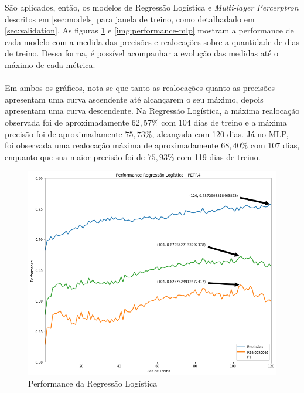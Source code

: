 \documentclass[grad,numbers]{coppe}
\begin{document}
        São aplicados, então, os modelos de Regressão Logística e \textit{Multi-layer Percerptron} descritos em \ref{sec:models} para janela de treino, como detalhadado em \ref{sec:validation}. As figuras \ref{img:performance-logreg} e \ref{img:performance-mlp} mostram a performance de cada modelo com a medida das precisões e realocações sobre a quantidade de dias de treino. Dessa forma, é possível acompanhar a evolução das medidas até o máximo de cada métrica.
        
        \paragraph{}Em ambos os gráficos, nota-se que tanto as realocações quanto as precisões apresentam uma curva ascendente até alcançarem o seu máximo, depois apresentam uma curva descendente. Na Regressão Logística, a máxima realocação observada foi de aproximadamente $62,57\%$ com 104 dias de treino e a máxima precisão foi de aproximadamente $75,73\%$, alcançada com 120 dias. Já no MLP, foi observada uma realocação máxima de aproximadamente $68,40\%$ com 107 dias, enquanto que sua maior precisão foi de $75,93\%$ com 119 dias de treino.
        
        \begin{figure}[h!]
            \caption{Performance da Regressão Logística}
            \label{img:performance-logreg}
            \includegraphics[width=13.1cm]{performance-logreg.png}
            \centering
        \end{figure}
        
\end{document}
